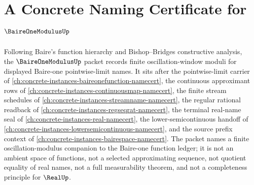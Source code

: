 \chapter{A Concrete Naming Certificate for $\BaireOneModulusUp$}
\label{ch:concrete-instances-baire-one-modulus-namecert}

Following Baire's function hierarchy and Bishop--Bridges constructive analysis, the $\BaireOneModulusUp$ packet records finite oscillation-window moduli for displayed Baire-one pointwise-limit names. It sits after the pointwise-limit carrier of \autoref{ch:concrete-instances-baireonefunction-namecert}, the continuous approximant rows of \autoref{ch:concrete-instances-continuousmap-namecert}, the finite stream schedules of \autoref{ch:concrete-instances-streamname-namecert}, the regular rational readback of \autoref{ch:concrete-instances-regseqrat-namecert}, the terminal real-name seal of \autoref{ch:concrete-instances-real-namecert}, the lower-semicontinuous handoff of \autoref{ch:concrete-instances-lowersemicontinuous-namecert}, and the source prefix context of \autoref{ch:concrete-instances-bairespace-namecert}. The packet names a finite oscillation-modulus companion to the Baire-one function ledger; it is not an ambient space of functions, not a selected approximating sequence, not quotient equality of real names, not a full measurability theorem, and not a completeness principle for $\RealUp$.

